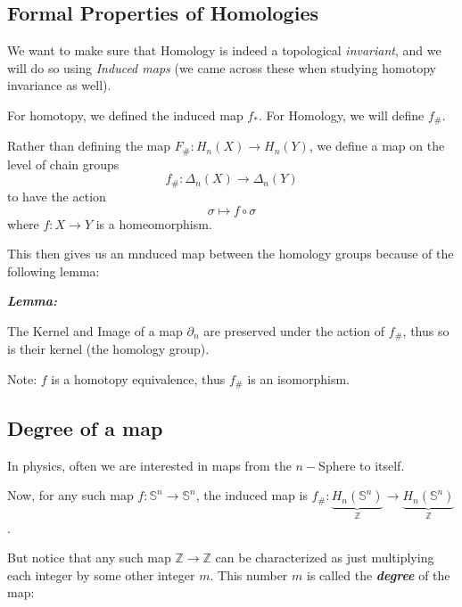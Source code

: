 \documentclass{article}
\begin{document}
\vskip 1cm
\subsection{Formal Properties of Homologies}

\vskip 0.5cm
We want to make sure that Homology is indeed a topological \emph{invariant}, and we will do so using \emph{Induced maps} (we came across these when studying homotopy invariance as well).

For homotopy, we defined the induced map $f_*$. For Homology, we will define $f_{\#}$.

\vskip 0.5cm
\begin{mathdefinitionbox}{}
  Rather than defining the map $F_{\#} : H_n(X) \rightarrow H_n(Y)$, we define a map on the level of chain groups 
  \[ f_{\#} : \Delta_n(X) \rightarrow \Delta_n(Y) \] to have the action \[ \sigma \mapsto f \circ \sigma \]
  where $f : X \rightarrow Y$ is a homeomorphism.
\end{mathdefinitionbox}

\vskip 0.5cm
This then gives us an mnduced map between the homology groups because of the following lemma:

\vskip 0.5cm
\begin{dottedbox}
  \emph{\textbf{Lemma:}} 
\end{dottedbox}

The Kernel and Image of a map $\partial_n$ are preserved under the action of $f_{\#}$, thus so is their kernel (the homology group).

\begin{dottedbox}
  Note: $f$ is a homotopy equivalence, thus $f_{\#}$ is an isomorphism.
\end{dottedbox}

\vskip 0.5cm
\subsection*{Degree of a map}

\vskip 0.5cm
In physics, often we are interested in maps from the $n-$Sphere to itself.

\vskip 0.5cm
Now, for any such map $f : \mathbb{S}^n \rightarrow \mathbb{S}^n$, the induced map is $f_{\#} : \underbrace{H_n(\mathbb{S}^n)}_{\mathbb{Z}} \rightarrow \underbrace{H_n(\mathbb{S}^n)}_{\mathbb{Z}}$. 

\vskip 0.5cm
But notice that any such map $\mathbb{Z} \rightarrow \mathbb{Z}$ can be characterized as just multiplying each integer by some other integer $m$. This number $m$ is called the \emph{\textbf{degree}} of the map:
\end{document}

